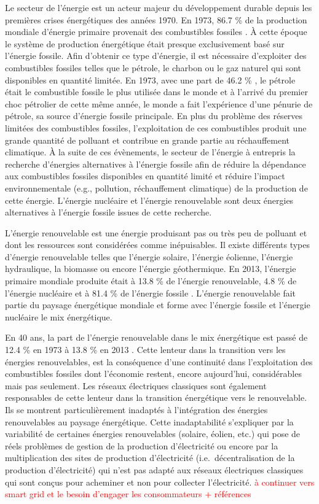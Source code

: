 \documentclass[10pt,a5paper,twoside]{article}
\begin{document}
Le secteur de l'énergie est un acteur majeur du développement durable
depuis les premières crises énergétiques des années 1970. En 1973, 86.7
\% de la production mondiale d'énergie primaire provenait des
combustibles fossiles \citep{iea2015key}. À cette époque le système de
production énergétique était presque exclusivement basé sur l'énergie
fossile. Afin d'obtenir ce type d'énergie, il est nécessaire d'exploiter
des combustibles fossiles telles que le pétrole, le charbon ou le gaz
naturel qui sont disponibles en quantité limitée. En 1973, avec une part
de 46.2 \% \citep{iea2015key}, le pétrole était le combustible fossile
le plus utilisée dans le monde et à l'arrivé du premier choc pétrolier
de cette même année, le monde a fait l'expérience d'une pénurie de
pétrole, sa source d'énergie fossile principale. En plus du problème des
réserves limitées des combustibles fossiles, l'exploitation de ces
combustibles produit une grande quantité de polluant et contribue en
grande partie au réchauffement climatique. À la suite de ces évènements,
le secteur de l'énergie à entrepris la recherche d'énergies alternatives
à l'énergie fossile afin de réduire la dépendance aux combustibles
fossiles disponibles en quantité limité et réduire l'impact
environnementale (e.g., pollution, réchauffement climatique) de la
production de cette énergie. L'énergie nucléaire et l'énergie
renouvelable sont deux énergies alternatives à l'énergie fossile issues
de cette recherche.

L'énergie renouvelable est une énergie produisant pas ou très peu de
polluant et dont les ressources sont considérées comme inépuisables. Il
existe différents types d'énergie renouvelable telles que l'énergie
solaire, l'énergie éolienne, l'énergie hydraulique, la biomasse ou
encore l'énergie géothermique. En 2013, l'énergie primaire mondiale
produite était à 13.8 \% de l'énergie renouvelable, 4.8 \% de l'énergie
nucléaire et à 81.4 \% de l'énergie fossile \citep{iea2015key}.
L'énergie renouvelable fait partie du paysage énergétique mondiale et
forme avec l'énergie fossile et l'énergie nucléaire le mix énergétique.

En 40 ans, la part de l'énergie renouvelable dans le mix énergétique est
passé de 12.4 \% en 1973 à 13.8 \% en 2013 \citep{iea2015key}. Cette
lenteur dans la transition vers les énergies renouvelables, est la
conséquence d'une continuité dans l'exploitation des combustibles
fossiles dont l'économie restent, encore aujourd'hui, considérables mais
pas seulement. Les réseaux électriques classiques sont également
responsables de cette lenteur dans la transition énergétique vers le
renouvelable. Ils se montrent particulièrement inadaptés à l'intégration
des énergies renouvelables au paysage énergétique. Cette inadaptabilité
s'expliquer par la variabilité de certaines énergies renouvelables
(solaire, éolien, etc.) qui pose de réels problèmes de gestion de la
production d'électricité ou encore par la multiplication des sites de
production d'électricité (i.e.~décentralisation de la production
d'électricité) qui n'est pas adapté aux réseaux électriques classiques
qui sont conçus pour acheminer et non pour collecter l'électricité.
\textcolor{red}{à continuer vers smart grid et le besoin d'engager les consommateurs + références}
\end{document}
